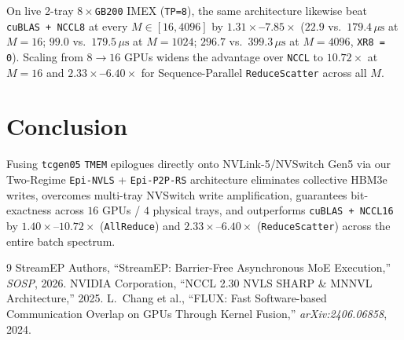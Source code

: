 \documentclass[conference,10pt]{IEEEtran}
\begin{document}
On live 2-tray $8{\times}$\texttt{GB200} IMEX (\texttt{TP=8}), the same architecture likewise beat \texttt{cuBLAS + NCCL8} at every $M \in [16, 4096]$ by \textbf{$1.31\times$--$7.85\times$} ($22.9$ vs.\ $179.4\,\mu\text{s}$ at $M{=}16$; $99.0$ vs.\ $179.5\,\mu\text{s}$ at $M{=}1024$; $296.7$ vs.\ $399.3\,\mu\text{s}$ at $M{=}4096$, \texttt{XR8 = 0}). Scaling from $8\to 16$ GPUs widens the advantage over \texttt{NCCL} to \textbf{$10.72\times$} at $M{=}16$ and \textbf{$2.33\times$--$6.40\times$} for Sequence-Parallel \texttt{ReduceScatter} across all $M$.

\section{Conclusion}
Fusing \texttt{tcgen05} \texttt{TMEM} epilogues directly onto NVLink-5/NVSwitch Gen5 via our Two-Regime \texttt{Epi-NVLS} + \texttt{Epi-P2P-RS} architecture eliminates collective HBM3e writes, overcomes multi-tray NVSwitch write amplification, guarantees bit-exactness across $16$ GPUs / $4$ physical trays, and outperforms \texttt{cuBLAS + NCCL16} by $1.40\times$--$10.72\times$ (\texttt{AllReduce}) and $2.33\times$--$6.40\times$ (\texttt{ReduceScatter}) across the entire batch spectrum.

\begin{thebibliography}{9}
 StreamEP Authors, ``StreamEP: Barrier-Free Asynchronous MoE Execution,'' \emph{SOSP}, 2026.
 NVIDIA Corporation, ``NCCL 2.30 NVLS SHARP \& MNNVL Architecture,'' 2025.
 L.~Chang et al., ``FLUX: Fast Software-based Communication Overlap on GPUs Through Kernel Fusion,'' \emph{arXiv:2406.06858}, 2024.
\end{thebibliography}
\end{document}

